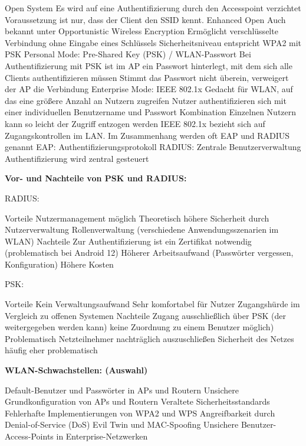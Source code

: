 \documentclass[asp1.tex]{subfiles}
\begin{document}
\begin{outline}
    \1 Open System
        \2 Es wird auf eine Authentifizierung durch den Accesspoint verzichtet
        \2 Voraussetzung ist nur, dass der Client den SSID kennt.
    \1 Enhanced Open
        \2 Auch bekannt unter Opportunistic Wireless Encryption
        \2 Ermöglicht verschlüsselte Verbindung ohne Eingabe eines Schlüssels
        \2 Sicherheitsniveau entspricht WPA2 mit PSK
    \1 Personal Mode: Pre-Shared Key (PSK) / WLAN-Passwort
        \2 Bei Authentifizierung mit PSK ist im AP ein Passwort hinterlegt, mit dem sich alle Clients authentifizieren müssen
        \2 Stimmt das Passwort nicht überein, verweigert der AP die Verbindung
    \1 Enterprise Mode: IEEE 802.1x
        \2 Gedacht für WLAN, auf das eine größere Anzahl an Nutzern zugreifen
        \2 Nutzer authentifizieren sich mit einer individuellen Benutzername und Passwort Kombination
        \2 Einzelnen Nutzern kann so leicht der Zugriff entzogen werden
        \2 IEEE 802.1x bezieht sich auf Zugangskontrollen im LAN. Im Zusammenhang werden oft EAP und RADIUS genannt
        \2 EAP: Authentifizierungsprotokoll
        \2 RADIUS:
            \3 Zentrale Benutzerverwaltung
            \3 Authentifizierung wird zentral gesteuert
\end{outline}


\textbf{Vor- und Nachteile von PSK und RADIUS:}

RADIUS:
\begin{outline}
    \1 Vorteile
        \2 Nutzermanagement möglich
        \2 Theoretisch höhere Sicherheit durch Nutzerverwaltung
        \2 Rollenverwaltung (verschiedene Anwendungsszenarien im WLAN)
    \1 Nachteile
        \2 Zur Authentifizierung ist ein Zertifikat notwendig (problematisch bei Android 12)
        \2 Höherer Arbeitsaufwand (Passwörter vergessen, Konfiguration)
        \2 Höhere Kosten
\end{outline}

\break
PSK:
\begin{outline}
    \1 Vorteile
        \2 Kein Verwaltungsaufwand
        \2 Sehr komfortabel für Nutzer
        \2 Zugangshürde im Vergleich zu offenen Systemen
    \1 Nachteile
        \2 Zugang ausschließlich über PSK (der weitergegeben werden kann) \textrightarrow\space keine Zuordnung zu einem Benutzer möglich)
        \2 Problematisch Netzteilnehmer nachträglich auszuschließen
        \2 Sicherheit des Netzes häufig eher problematisch
\end{outline}


\textbf{WLAN-Schwachstellen: (Auswahl)}
\begin{outline}
   \1 Default-Benutzer und Passwörter in APs und Routern
   \1 Unsichere Grundkonfiguration von APs und Routern
   \1 Veraltete Sicherheitsstandards
   \1 Fehlerhafte Implementierungen von WPA2 und WPS
   \1 Angreifbarkeit durch Denial-of-Service (DoS)
   \1 Evil Twin und MAC-Spoofing
   \1 Unsichere Benutzer-Access-Points in Enterprise-Netzwerken
\end{outline}
\end{document}
